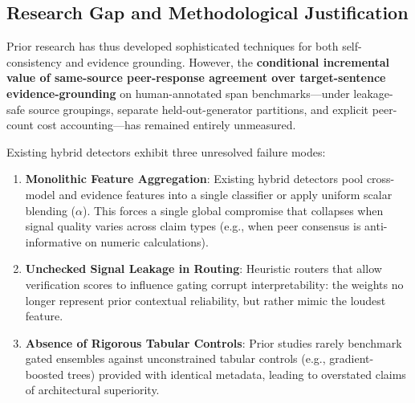 \documentclass[pdflatex,sn-mathphys,Numbered]{sn-jnl}
\begin{document}
\subsection{Research Gap and Methodological Justification}\label{subsec:gap_justification}

Prior research has thus developed sophisticated techniques for both self-consistency and evidence grounding. However, the \textbf{conditional incremental value of same-source peer-response agreement over target-sentence evidence-grounding} on human-annotated span benchmarks—under leakage-safe source groupings, separate held-out-generator partitions, and explicit peer-count cost accounting—has remained entirely unmeasured.

Existing hybrid detectors exhibit three unresolved failure modes:
\begin{enumerate}
    \item \textbf{Monolithic Feature Aggregation}: Existing hybrid detectors pool cross-model and evidence features into a single classifier or apply uniform scalar blending ($\alpha$). This forces a single global compromise that collapses when signal quality varies across claim types (e.g., when peer consensus is anti-informative on numeric calculations).
    \item \textbf{Unchecked Signal Leakage in Routing}: Heuristic routers that allow verification scores to influence gating corrupt interpretability: the weights no longer represent prior contextual reliability, but rather mimic the loudest feature.
    \item \textbf{Absence of Rigorous Tabular Controls}: Prior studies rarely benchmark gated ensembles against unconstrained tabular controls (e.g., gradient-boosted trees) provided with identical metadata, leading to overstated claims of architectural superiority.
\end{enumerate}
\end{document}
